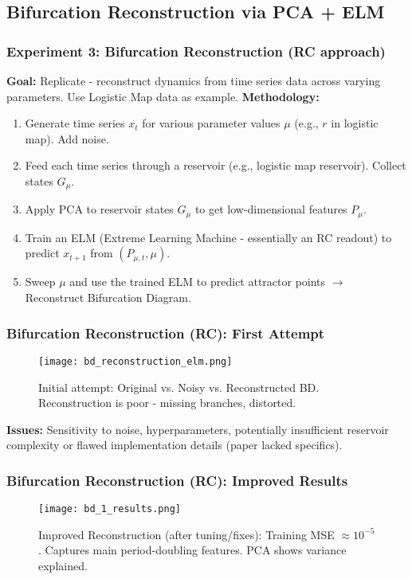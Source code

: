 \documentclass{beamer}
\begin{document}
\subsection{Bifurcation Reconstruction via PCA + ELM}

\begin{frame}
    \frametitle{Experiment 3: Bifurcation Reconstruction (RC approach)}
    \textbf{Goal:} Replicate \cite{Itoh2020} - reconstruct dynamics from time series data across varying parameters. Use Logistic Map data as example.
    \vspace{1em}
    \textbf{Methodology:}
    \begin{enumerate}
        \item Generate time series $x_t$ for various parameter values $\mu$ (e.g., $r$ in logistic map). Add noise.
        \item Feed each time series through a reservoir (e.g., logistic map reservoir). Collect states $G_\mu$.
        \item Apply PCA to reservoir states $G_\mu$ to get low-dimensional features $P_\mu$.
        \item Train an ELM (Extreme Learning Machine - essentially an RC readout) to predict $x_{t+1}$ from $(P_{\mu, t}, \mu)$.
        \item Sweep $\mu$ and use the trained ELM to predict attractor points $\rightarrow$ Reconstruct Bifurcation Diagram.
    \end{enumerate}
\end{frame}

\begin{frame}
    \frametitle{Bifurcation Reconstruction (RC): First Attempt}
     \begin{figure}
        \centering
        \texttt{[image: bd\_reconstruction\_elm.png]}
        \caption{Initial attempt: Original vs. Noisy vs. Reconstructed BD. Reconstruction is poor - missing branches, distorted.}
        \label{fig:bifurcation_slide}
    \end{figure}
    \textbf{Issues:} Sensitivity to noise, hyperparameters, potentially insufficient reservoir complexity or flawed implementation details (paper lacked specifics).
\end{frame}

\begin{frame}
    \frametitle{Bifurcation Reconstruction (RC): Improved Results}
     \begin{figure}
        \centering
        \texttt{[image: bd\_1\_results.png]}
        \caption{Improved Reconstruction (after tuning/fixes): Training MSE $\approx 10^{-5}$. Captures main period-doubling features. PCA shows variance explained.}
        \label{fig:bd_1_slide}
    \end{figure}
\end{frame}
\end{document}

